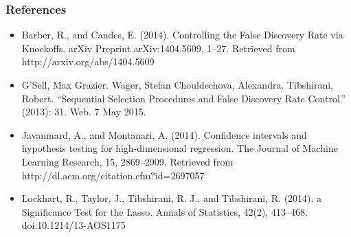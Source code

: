 \documentclass{beamer}
\begin{document}
\begin{frame}
\frametitle{References}
\begin{itemize}
\item Barber, R., and Candes, E. (2014). Controlling the False Discovery Rate via Knockoffs. arXiv Preprint arXiv:1404.5609, 1–27. Retrieved from http://arxiv.org/abs/1404.5609
\item G’Sell, Max Grazier. Wager, Stefan
Chouldechova, Alexandra.
Tibshirani, Robert. “Sequential Selection Procedures and False Discovery Rate Control.” (2013): 31. Web. 7 May 2015.
\item Javanmard, A., and Montanari, A. (2014). Confidence intervals and hypothesis testing for high-dimensional regression. The Journal of Machine Learning Research, 15, 2869–2909. Retrieved from http://dl.acm.org/citation.cfm?id=2697057
\item Lockhart, R., Taylor, J., Tibshirani, R. J., and Tibshirani, R. (2014). a Significance Test for the Lasso. Annals of Statistics, 42(2), 413–468. doi:10.1214/13-AOS1175
\end{itemize}
\end{frame}
\end{document}

